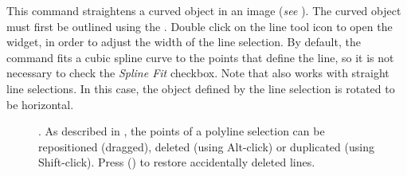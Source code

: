 This command straightens a curved object in an
image (\emph{see} ). The
curved object must first be outlined using the .
Double click on the line tool icon to open the 
widget, in order to adjust the width of the line selection. By default,
the  command fits a cubic spline
curve to the points that define the line, so it is not necessary to
check the \emph{Spline Fit} checkbox. Note that 
also works with straight line selections. In this case, the object
defined by the line selection is rotated to be horizontal.
\begin{figure}[h]
\caption[Straightening filamentous objects]{\textbf{\label{fig:Straighten}}\protect{}.
As described in , the points
of a polyline selection can be repositioned (dragged), deleted (using
Alt-click) or duplicated (using Shift-click). Press \protect{}
\protect{} (\protect{})
to restore accidentally deleted lines.}
\end{figure}





\subsubsection{\protect{}\label{sub:To-Bounding-Box}}

